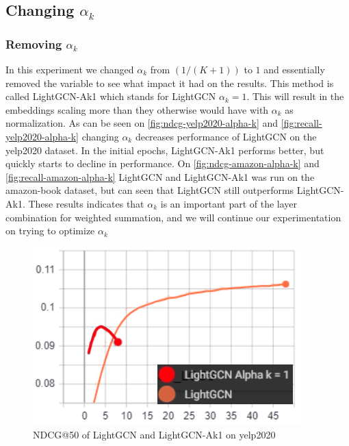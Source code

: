 \subsection{Changing $\alpha_k$}

\subsubsection{Removing $\alpha_k$}\label{subsubsec:remove-alpha-k}
In this experiment we changed $\alpha_k$ from $(1 / (K + 1))$ to $1$ and essentially removed the variable to see what impact it had on the results.
This method is called LightGCN-Ak1 which stands for LightGCN $\alpha_k = 1$.
This will result in the embeddings scaling more than they otherwise would have with $\alpha_k$ as normalization.
As can be seen on \autoref{fig:ndcg-yelp2020-alpha-k} and \autoref{fig:recall-yelp2020-alpha-k} changing $\alpha_k$ decreases performance of LightGCN on the yelp2020 dataset.
In the initial epochs, LightGCN-Ak1 performs better, but quickly starts to decline in performance.
On \autoref{fig:ndcg-amazon-alpha-k} and \autoref{fig:recall-amazon-alpha-k} LightGCN and LightGCN-Ak1 was run on the amazon-book dataset, but can seen that LightGCN still outperforms LightGCN-Ak1.
These results indicates that $\alpha_k$ is an important part of the layer combination for weighted summation, and we will continue our experimentation on trying to optimize $\alpha_k$
\begin{figure}
    \includegraphics[width=\linewidth]{figures/alpha-k-results/yelp2020-ndcg.png}
    \caption{NDCG@50 of LightGCN and LightGCN-Ak1 on yelp2020}
    \label{fig:ndcg-yelp2020-alpha-k}
\end{figure}
